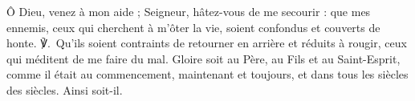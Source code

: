 Ô Dieu, venez à mon aide ; Seigneur, hâtez-vous de me secourir : que mes ennemis, ceux qui cherchent à m’ôter la vie, soient confondus et couverts de honte.
℣.~Qu’ils soient contraints de retourner en arrière et réduits à rougir, ceux qui méditent de me faire du mal.
Gloire soit au Père, au Fils et au Saint-Esprit, comme il était au commencement, maintenant et toujours, et dans tous les siècles des siècles. Ainsi \mbox{soit-il}.
